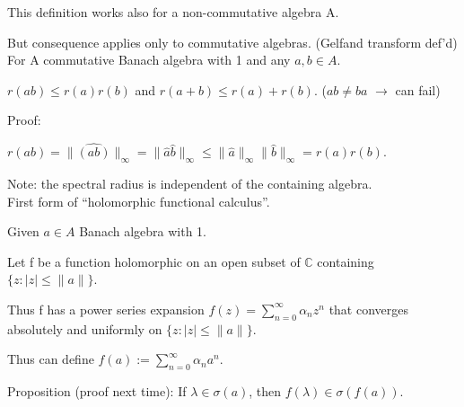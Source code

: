 \documentclass[12pt]{article}
\begin{document}
This definition works also for a non-commutative algebra A.

But consequence applies only to commutative algebras. (Gelfand transform def'd)\\

\noindent
For A commutative Banach algebra with 1 and any $a, b \in A$.

$r(ab) \leq r(a)r(b)$ and $r(a + b) \leq r(a) + r(b)$. ($ab \neq ba$ $\to$ can fail)

\noindent
Proof:

$r(ab) = \|\hat{(ab)}\|_\infty = \|\hat{a}\hat{b}\|_\infty \leq \|\hat{a}\|_\infty\|\hat{b}\|_\infty = r(a)r(b)$.

\noindent
Note: the spectral radius is independent of the containing algebra.\\

\noindent
First form of ``holomorphic functional calculus''.

\noindent
Given $a \in A$ Banach algebra with 1.

Let f be a function holomorphic on an open subset of $\mathds{C}$ containing $\{z : |z| \leq \|a\|\}$.

Thus f has a power series expansion $f(z) = \sum_{n = 0}^\infty \alpha_nz^n$ that converges absolutely and uniformly on $\{z : |z| \leq \|a\|\}$.

Thus can define $f(a) := \sum_{n = 0}^\infty\alpha_n a^n$.

\noindent
Proposition (proof next time): If $\lambda \in \sigma(a)$, then $f(\lambda) \in \sigma(f(a))$.
\end{document}
